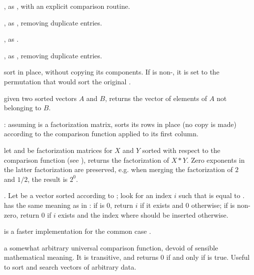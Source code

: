 , as
, with an explicit comparison routine.

, as
, removing duplicate entries.

,
as .

,
as , removing duplicate entries.

 sort  in place, without copying its components. If
 is non-, it is set to the permutation that would sort
the original .

 given two sorted
vectors $A$ and $B$, returns the vector of elements of $A$ not belonging to
$B$.

:
assuming  is a factorization matrix, sorts its rows in place (no copy
is made) according to the comparison function  applied to its first
column.

let  and  be factorization matrices for $X$ and $Y$
sorted with respect to the comparison function  (see
), returns the factorization of $X * Y$. Zero exponents in
the latter factorization are preserved, e.g. when merging the factorization
of $2$ and $1/2$, the result is $2^0$.

.\hfil\break
Let  be a vector sorted according to ; look for an
index $i$ such that   is equal to .  has the
same meaning as in : if  is 0, return $i$ if it
exists and 0 otherwise; if  is non-zero, return $0$ if $i$ exists
and the index where  should be inserted otherwise.

 is a faster
implementation for the common case .


 a somewhat arbitrary universal
comparison function, devoid of sensible mathematical meaning. It is
transitive, and returns 0 if and only if  is true.
Useful to sort and search vectors of arbitrary data.

